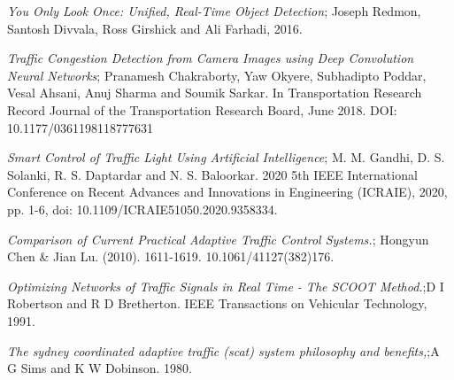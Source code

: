 \documentclass[openany,12pt]{report}
\begin{document}
	\begin{thebibliography}{99}
		
		\emph{You Only Look Once: Unified, Real-Time Object Detection}; Joseph Redmon, Santosh Divvala, Ross Girshick and Ali Farhadi, 2016.
		
		\emph{Traffic Congestion Detection from Camera Images using Deep Convolution Neural Networks}; Pranamesh Chakraborty, Yaw Okyere, Subhadipto Poddar, Vesal Ahsani, Anuj Sharma and Soumik Sarkar. In Transportation Research Record Journal of the Transportation Research Board, June 2018. DOI: 10.1177/0361198118777631
		
		\emph{Smart Control of Traffic Light Using Artificial Intelligence}; M. M. Gandhi, D. S. Solanki, R. S. Daptardar and N. S. Baloorkar. 2020 5th IEEE International Conference on Recent Advances and Innovations in Engineering (ICRAIE), 2020, pp. 1-6, doi: 10.1109/ICRAIE51050.2020.9358334.
		
		\emph{Comparison of Current Practical Adaptive Traffic Control Systems.}; Hongyun Chen \& Jian Lu. (2010). 1611-1619. 10.1061/41127(382)176. 
		
		\emph{Optimizing Networks of Traffic Signals in Real Time - The SCOOT Method.};D I Robertson and R D Bretherton. IEEE Transactions on Vehicular Technology, 1991.
		
		\emph{The sydney coordinated adaptive traffic (scat) system philosophy and benefits,};A G Sims and K W Dobinson. 1980.
		
	\end{thebibliography}
\end{document}
